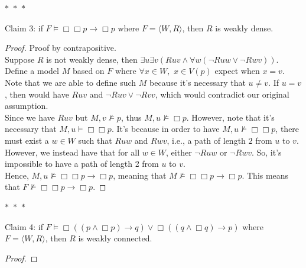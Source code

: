 \documentclass[12pt]{article}
\newcommand{\B}{\Box}
\newcommand{\s}{\vDash}
\newcommand{\ns}{\nvDash}
\begin{document}
\noindent
\begin{center}
    $\ast$~$\ast$~$\ast$
\end{center}
Claim 3: if $F \vDash \B \B p \rightarrow \B p$ where $F = \langle W, R \rangle$, then $R$ is weakly dense. 
\begin{proof} Proof by contrapositive.\\
    Suppose $R$ is not weakly dense, then $\exists u \exists v (Ruv \land \forall w(\neg Ruw \lor \neg Rwv))$.
    Define a model $M$ based on $F$ where $\forall x \in W,$ $x \in V(p)$ expect when $x = v$.
    Note that we are able to define such $M$ because it's necessary that $u \neq v$. If $u = v$, then would have $Ruv$ and $\neg Ruv \lor \neg Rvv$, which would contradict our original assumption.\\
    Since we have $Ruv$ but $M, v \ns p$, thus $M, u \ns \B p$.
    However, note that it's necessary that $M, u \s \B \B p$.
    It's because in order to have $M, u \ns \B \B p$, there must exist a $w \in W$ such that $Ruw$ and $Rwv$, i.e., a path of length $2$ from $u$ to $v$.
    However, we instead have that for all $w \in W$, either $\neg Ruw$ or $\neg Rwv$.
    So, it's impossible to have a path of length 2 from $u$ to $v$.\\
    Hence, $M, u \ns \B \B p \to \B p$, meaning that $M \ns \B \B p \to \B p$.
    This means that $F \ns \B \B p \to \B p$.

\end{proof}

\noindent
\begin{center}
    $\ast$~$\ast$~$\ast$
\end{center}
Claim 4: if $F \vDash \B((p \land \B p) \to q) \lor \B((q \land \B q) \to p)$ where $F = \langle W, R \rangle$, then $R$ is weakly connected. 
\begin{proof}
    
\end{proof}
\end{document}
